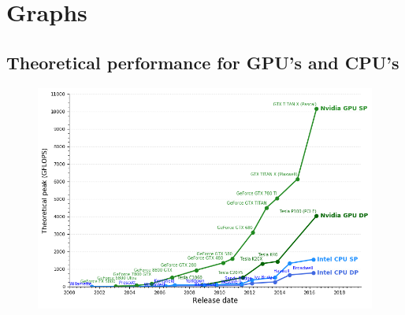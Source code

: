 \section{Graphs}
\subsection{Theoretical performance for GPU's and CPU's \cite{cpu-vs-gpu}}
\begin{figure}[H]
\centering
\includegraphics[width=\textwidth]{resources/graf.png}
\end{figure}